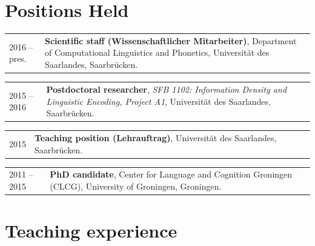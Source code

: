 \documentclass[a4paper,10pt]{article}
\def\leftcolwidth{.12\textwidth}
\def\tablevspace{10pt}
\begin{document}
\section*{Positions Held}

\noindent
\begin{tabularx}{\textwidth}{ p{\leftcolwidth} X }
  2016 -- pres.
  & \textbf{Scientific staff (Wissenschaftlicher Mitarbeiter)}, Department of
    Computational Linguistics and Phonetics, Universit\"at des Saarlandes,
    Saarbr\"ucken.\\
\end{tabularx}

\vspace{\tablevspace}

\noindent
\begin{tabularx}{\textwidth}{ p{\leftcolwidth} X }
  2015 -- 2016 
  & \textbf{Postdoctoral researcher}, \textit{SFB 1102: Information Density and
    Linguistic Encoding, Project A1}, Universit\"at des Saarlandes,
    Saarbr\"ucken.\\
\end{tabularx}

\vspace{\tablevspace}

\noindent
\begin{tabularx}{\textwidth}{ p{\leftcolwidth} X }
  2015 
  & \textbf{Teaching position (Lehrauftrag)}, Universit\"at des
      Saarlandes, Saarbr\"ucken.\\
\end{tabularx}

\vspace{\tablevspace}

\noindent
\begin{tabularx}{\textwidth}{ p{\leftcolwidth} X }
  2011 -- 2015  
  & \textbf{PhD candidate}, Center for Language and Cognition
      Groningen (CLCG), University of Groningen, Groningen.\\
\end{tabularx}


\section*{Teaching experience}
\end{document}
